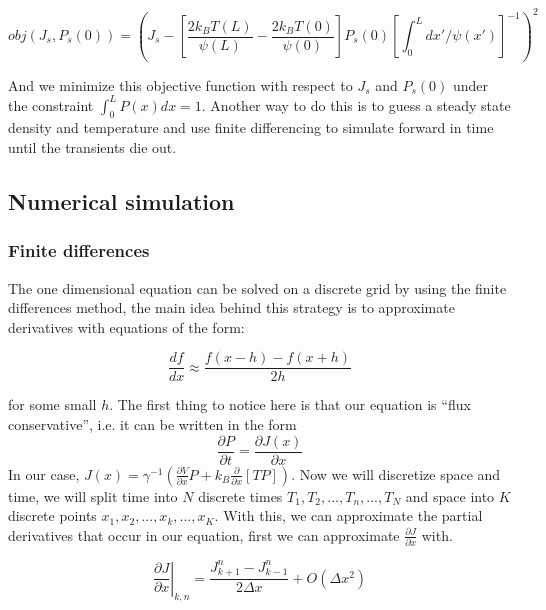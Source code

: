 \documentclass[11pt]{article} %
\begin{document}
\begin{equation}
obj(J_s, P_s(0)) = \left (J_s - \left [\frac{2 k_B T(L)}{\psi(L)} - \frac{2 k_B T(0)}{\psi(0)}  \right] P_s(0) \left [\int_0^L dx'/\psi(x') \right]^{-1} \right)^2  \label{eqn:Objective}
\end{equation}

And we minimize this objective function with respect to $J_s$ and $P_s(0)$ under the constraint $\int_0^L P(x) dx = 1$. Another way to do this is to guess a steady state density and temperature and use finite differencing to simulate forward in time until the transients die out.


\subsection{Numerical simulation} \label{numerics}

\subsubsection{Finite differences}
The one dimensional equation can be solved on a discrete grid by using the finite differences method, the main idea behind this strategy is to approximate derivatives with equations of the form:

\begin{equation}
\frac{d f}{d x} \approx \frac{f(x - h) - f(x + h)}{2h}
\end{equation}

for some small $h$. The first thing to notice here is that our equation is ``flux conservative'', i.e. it can be written in the form
$$ \frac{\partial P}{\partial t} = \frac{\partial J(x)}{\partial x} $$
In our case, $J(x) = \gamma^{-1} \left ( \frac{\partial V}{\partial x} P + k_B \frac{\partial}{\partial x} [T P] \right ) $. Now we will discretize space and time, we will split time into $N$ discrete times  $T_1, T_2, ..., T_n, ..., T_N$ and space into $K$ discrete points $x_1, x_2, ..., x_k, ..., x_K$. With this, we can approximate the partial derivatives that occur in our equation, first we can approximate $\frac{\partial J}{\partial x}$ with.

\begin{equation}
\left. \frac{\partial J}{\partial x} \right|_{k, n} = \frac{J_{k+1}^n - J_{k-1}^n}{2 \Delta x} + O(\Delta x^2)
\end{equation}
\end{document}
